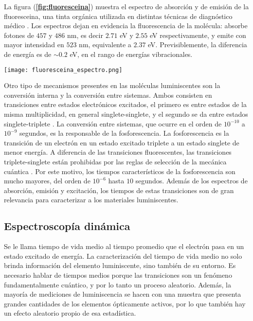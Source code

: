 \noindent La figura (\textbf{\ref{fig:fluoresceina}}) muestra el espectro de absorción y de emisión de la fluoresceina, una tinta orgánica utilizada en distintas técnicas de diagnóstico médico \cite{fluoresceina_1,fluoresceina_2}.
Los espectros dejan en evidencia la fluorescencia de la molécula: absorbe fotones de $457$ y $486$ nm, es decir $2.71$ eV y $2.55$ eV respectivamente, y emite con mayor intensidad en $523$ nm, equivalente a $2.37$ eV.
Previsiblemente, la diferencia de energía es de $\sim 0.2$ eV, en el rango de energías vibracionales.


\begin{SCfigure}
    \centering
    \texttt{[image: fluoresceina\_espectro.png]}
    \caption{\textbf{Espectro de la Fluoresceina} diluida en etanol, tanto de absorción (azul) como de emisión (rojo). El cuadro muestra los picos de absorción en $\lambda_{abs}=457$ nm y 486 nm, y de emisión en $\lambda_{em}$ = 523 nm. Tomada y adaptada de \cite{kristoffersen_testing_2018}.}
    \label{fig:fluoresceina}
\end{SCfigure}

Otro tipo de mecanismos presentes en las moléculas luminiscentes son la conversión interna y la conversión entre sistemas.
Ambos consisten en transiciones entre estados electrónicos excitados, el primero es entre estados de la misma multiplicidad, en general singlete-singlete, y el segundo se da entre estados singlete-triplete \cite{valeur_characteristics_2012}.
La conversión entre sistemas, que ocurre en el orden de $10^{-10}$ a $10^{-9}$ segundos, es la responsable de la fosforescencia.
La fosforescencia es la transición de un electrón en un estado excitado triplete a un estado singlete de menor energía.
A diferencia de las transiciones fluorescentes, las transiciones triplete-singlete están prohibidas por las reglas de selección de la mecánica cuántica \cite{demtroder_emission_2010}.
Por este motivo, los tiempos característicos de la fosforescencia son mucho mayores, del orden de $10^{-6}$ hasta $10$ segundos.
Además de los espectros de absorción, emisión y excitación, los tiempos de estas transiciones son de gran relevancia para caracterizar a los materiales luminiscentes.

\subsection{Espectroscopía dinámica} \label{sec:dinamica}



Se le llama tiempo de vida medio al tiempo promedio que el electrón pasa en un estado excitado de energía.
La caracterización del tiempo de vida medio no solo brinda información del elemento luminiscente, sino también de su entorno.
Es necesario hablar de tiempos medios porque las transiciones son un fenómeno fundamentalmente cuántico, y por lo tanto un proceso aleatorio.
Además, la mayoría de mediciones de luminiscencia se hacen con una muestra que presenta grandes cantidades de los elementos ópticamente activos, por lo que también hay un efecto aleatorio propio de esa estadística.

